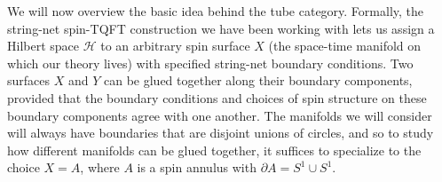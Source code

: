 \documentclass[12pt,a4paper]{article}
\newcommand{\mch}{\mathcal{H}}
\newcommand{\p}{\partial}
\newcommand{\kwsep}{\bigskip\hrule\medskip\hrule\medskip\hrule\bigskip}
\begin{document}

We will now overview the basic idea behind the tube category. 
Formally, the string-net spin-TQFT construction we have been working with lets us assign a Hilbert space $\mch$
to an arbitrary spin surface $X$ (the space-time manifold on which our theory lives) with specified string-net boundary conditions. 
Two surfaces $X$ and $Y$ can be glued together along their boundary components, provided that 
the boundary conditions and choices of spin structure on these boundary components agree with one another. 
The manifolds we will consider will always have boundaries that are disjoint unions of circles, and so to 
study how different manifolds can be glued together, it suffices to specialize to the choice $X = A$, 
where $A$ is a spin annulus with $\p A = S^1 \cup S^1$. 
\end{document}
